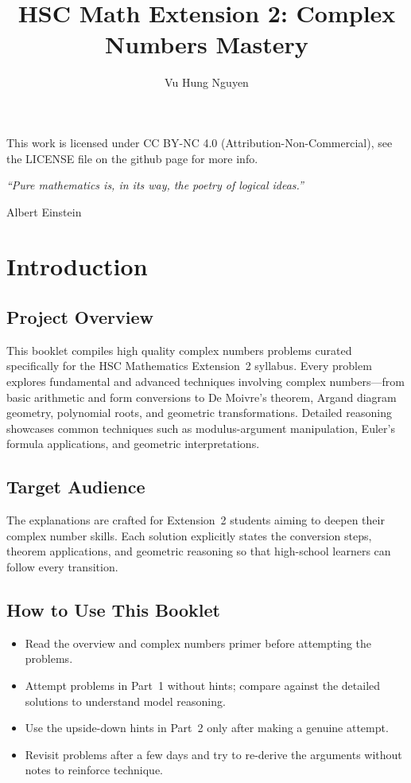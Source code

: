\documentclass[12pt]{article}
\author{Vu Hung Nguyen}
\title{HSC Math Extension 2: Complex Numbers Mastery}
\date{}
\begin{document}


\newpage


\begingroup\small\noindent This work is licensed under CC BY-NC 4.0 (Attribution-Non-Commercial), see the LICENSE file on the github page for more info.\par\endgroup

\newpage
\thispagestyle{empty}
\vspace*{\fill}
\begin{center}
\itshape
``Pure mathematics is, in its way, the poetry of logical ideas.''

\vspace{1em}
\normalfont Albert Einstein
\end{center}
\vspace*{\fill}

\newpage
\tableofcontents
\newpage

\section{Introduction}

\subsection{Project Overview}
This booklet compiles high quality complex numbers problems curated specifically for the HSC Mathematics Extension~2 syllabus. Every problem explores fundamental and advanced techniques involving complex numbers---from basic arithmetic and form conversions to De Moivre's theorem, Argand diagram geometry, polynomial roots, and geometric transformations. Detailed reasoning showcases common techniques such as modulus-argument manipulation, Euler's formula applications, and geometric interpretations.

\subsection{Target Audience}
The explanations are crafted for Extension~2 students aiming to deepen their complex number skills. Each solution explicitly states the conversion steps, theorem applications, and geometric reasoning so that high-school learners can follow every transition.

\subsection{How to Use This Booklet}
\begin{itemize}[leftmargin=*]
  \item Read the overview and complex numbers primer before attempting the problems.
  \item Attempt problems in Part~1 without hints; compare against the detailed solutions to understand model reasoning.
  \item Use the upside-down hints in Part~2 only after making a genuine attempt.
  \item Revisit problems after a few days and try to re-derive the arguments without notes to reinforce technique.
\end{itemize}
\end{document}
